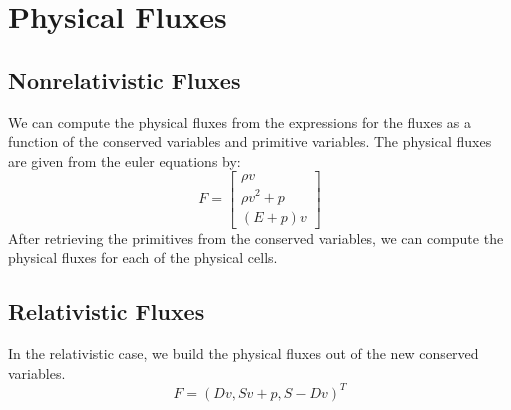 \section{Physical Fluxes}
\subsection{Nonrelativistic Fluxes}
We can compute the physical fluxes from the expressions for the fluxes as a function of the conserved variables and primitive variables. The physical fluxes are given from the euler equations by:
$$F = \begin{bmatrix} \rho v\\ \rho v^2 +p \\ (E+p)v \end{bmatrix}$$
After retrieving the primitives from the conserved variables, we can compute the physical fluxes for each of the physical cells. 
\subsection{Relativistic Fluxes}
In the relativistic case, we build the physical fluxes out of the new conserved variables.
$$F=(D v , Sv + p , S - D v )^T$$
